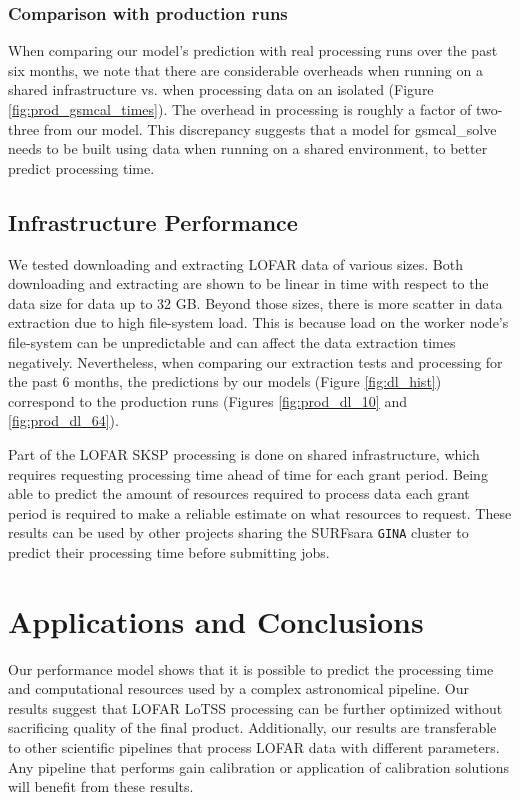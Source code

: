 \subsubsection{Comparison with production runs}

When comparing our model's prediction with real processing runs over the past six months, we note that there are considerable overheads when running on a shared infrastructure vs. when processing data on an isolated (Figure \ref{fig:prod_gsmcal_times}). The overhead in processing is roughly a factor of two-three from our model. This discrepancy suggests that a model for {\selectfont gsmcal\_solve} needs to be built using data when running on a shared environment, to better predict processing time. 

\subsection{Infrastructure Performance}
We tested downloading and extracting LOFAR data of various sizes. Both downloading and extracting are shown to be linear in time with respect to the data size for data up to 32 GB. Beyond those sizes, there is more scatter in data extraction due to high file-system load. This is because load on the worker node's file-system can be unpredictable and can affect the data extraction times negatively. Nevertheless, when comparing our extraction tests and processing for the past 6 months, the predictions by our models (Figure \ref{fig:dl_hist}) correspond to the production runs (Figures \ref{fig:prod_dl_10} and \ref{fig:prod_dl_64}).  


Part of the LOFAR SKSP processing is done on shared infrastructure, which requires requesting processing time ahead of time for each grant period. Being able to predict the amount of resources required to process data each grant period is required to make a reliable estimate on what resources to request. These results can be used by other projects sharing the SURFsara \texttt{GINA} cluster to predict their processing time before submitting jobs. 

\section{Applications and Conclusions}

Our performance model shows that it is possible to predict the processing time and computational resources used by a complex astronomical pipeline. Our results suggest that LOFAR LoTSS processing can be further optimized without sacrificing quality of the final product. Additionally, our results are transferable to other scientific pipelines that process LOFAR data with different parameters.  Any pipeline that performs gain calibration or application of calibration solutions will benefit from these results. 

